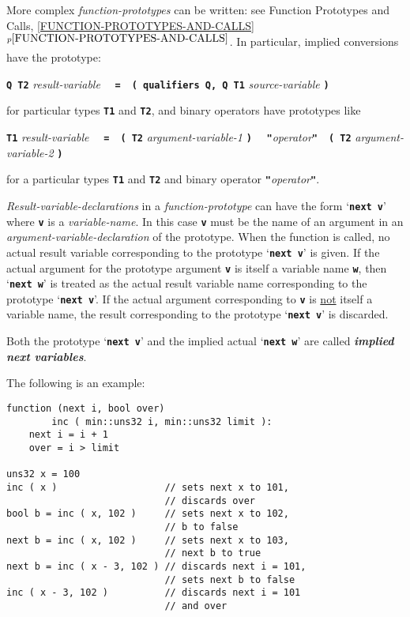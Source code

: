 \documentclass[12pt]{article}
\newcommand{\TT}[1]{{\tt \bfseries #1}}
\newcommand{\key}[1]{{\bf \em #1}\index{#1}}
\newcommand{\itemref}[1]{\ref{#1}$^{p\pageref{#1}}$}
\newenvironment{indpar}[1][0.3in]%
	{\begin{list}{}%
		     {\setlength{\itemsep}{0in}%
		      \setlength{\topsep}{0in}%
		      \setlength{\parsep}{1ex}%
		      \setlength{\labelwidth}{#1}%
		      \setlength{\leftmargin}{#1}%
		      \addtolength{\leftmargin}{\labelsep}}%
	 \item}%
	{\end{list}}
\begin{document}
More complex {\em function-prototypes} can be written:
see Function Prototypes and Calls, \itemref{FUNCTION-PROTOTYPES-AND-CALLS}.
In particular, implied conversions have the prototype:
\begin{center}
\TT{Q T2} {\em result-variable}%
    ~~\TT{=}~~\TT{( qualifiers Q, Q T1} {\em source-variable} \TT{)}
\end{center}
for particular types \TT{T1} and \TT{T2}, and binary operators have prototypes
like
\begin{center}
\TT{T1} {\em result-variable}%
    ~~\TT{=}~~\TT{( T2} {\em argument-variable-1} \TT{)}
    ~~\TT{"}{\em operator}\TT{"}~~\TT{( T2} {\em argument-variable-2} \TT{)}
\end{center}
for a particular types \TT{T1} and \TT{T2}
and binary operator \TT{"}{\em operator}\TT{"}.

{\em Result-variable-declarations} in a {\em function-prototype}
can have the form `\TT{next~v}' where \TT{v} is a {\em variable-name}.%
In this case \TT{v} must be the name of
an argument in an {\em argument-variable-declaration} of
the prototype.
When the function is called, no actual result variable corresponding
to the prototype `\TT{next v}' is given.
If the actual argument for the prototype argument \TT{v} is itself
a variable name \TT{w}, then `\TT{next w}' is treated as the actual
result variable name corresponding to the prototype `\TT{next v}'.
If the actual argument corresponding to \TT{v}
is \underline{not} itself a variable name, the result corresponding
to the prototype `\TT{next v}' is discarded.

Both the prototype `\TT{next v}' and the implied actual `\TT{next w}'
are called \key{implied next variables}.\label{IMPLIED-NEXT-VARIABLES}

The following is an example:

\begin{indpar}\begin{verbatim}
function (next i, bool over)
        inc ( min::uns32 i, min::uns32 limit ):
    next i = i + 1
    over = i > limit

uns32 x = 100
inc ( x )                   // sets next x to 101,
                            // discards over
bool b = inc ( x, 102 )     // sets next x to 102,
                            // b to false
next b = inc ( x, 102 )     // sets next x to 103,
                            // next b to true
next b = inc ( x - 3, 102 ) // discards next i = 101,
                            // sets next b to false
inc ( x - 3, 102 )          // discards next i = 101
                            // and over
\end{verbatim}\end{indpar}
\end{document}
